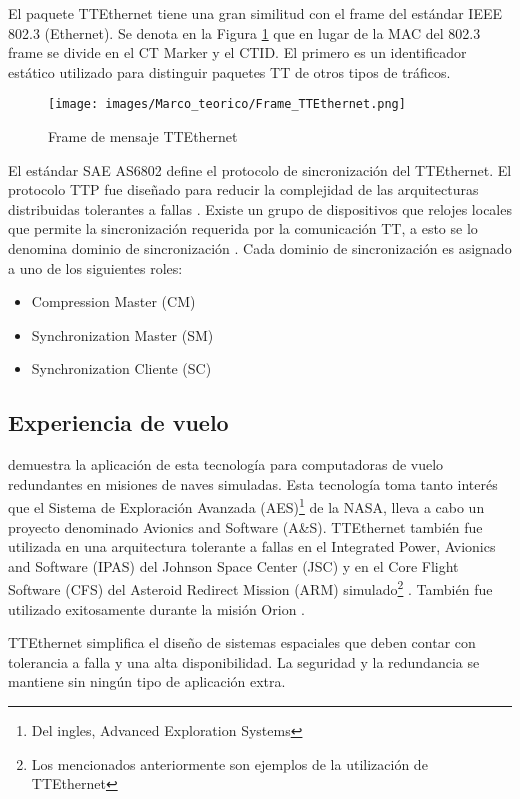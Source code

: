 El paquete TTEthernet tiene una gran similitud con el frame del estándar IEEE 802.3 (Ethernet). Se denota en la Figura \ref{fig:Frame_TTEthernet} que en lugar de la MAC del 802.3 frame se divide en el CT Marker y el CTID. El primero es un identificador estático utilizado para distinguir paquetes \ac{TT} de otros tipos de tráficos.

\begin{figure}[h]
 \centering
 \texttt{[image: images/Marco\_teorico/Frame\_TTEthernet.png]}
  \caption{Frame de mensaje TTEthernet}
\label{fig:Frame_TTEthernet}
\end{figure}

El estándar SAE AS6802 define el protocolo de sincronización del TTEthernet. El protocolo TTP fue diseñado para reducir la complejidad de las arquitecturas distribuidas tolerantes a fallas \citep{TTTechWeb}. Existe un grupo de dispositivos que relojes locales que permite la sincronización requerida por la comunicación \ac{TT}, a esto se lo denomina dominio de sincronización \citep{Loveless15}. Cada dominio de sincronización es asignado a uno de los siguientes roles:
\begin{itemize}
	\item Compression Master (CM)
	\item Synchronization Master (SM)
	\item Synchronization Cliente (SC)
\end{itemize}

\subsection{Experiencia de vuelo}
\cite{Loveless15} demuestra la aplicación de esta tecnología para computadoras de vuelo redundantes en misiones de naves simuladas. Esta tecnología toma tanto interés que el Sistema de Exploración Avanzada (AES)\footnote{Del ingles, Advanced Exploration Systems} de la \ac{NASA}, lleva a cabo un proyecto denominado Avionics and Software (A&S). TTEthernet también fue utilizada en una arquitectura tolerante a fallas en el Integrated Power, Avionics and Software (IPAS)  del Johnson Space Center (JSC) y en el Core Flight Software (CFS) del Asteroid Redirect Mission (ARM) simulado\footnote{Los mencionados anteriormente son ejemplos de la utilización de TTEthernet} \citep{Loveless15}. También fue utilizado exitosamente durante la misión Orion \citep{TTTechOrion} .

TTEthernet simplifica el diseño de sistemas espaciales que deben contar con tolerancia a falla y una alta disponibilidad. La seguridad y la redundancia se mantiene sin ningún tipo de aplicación extra.
